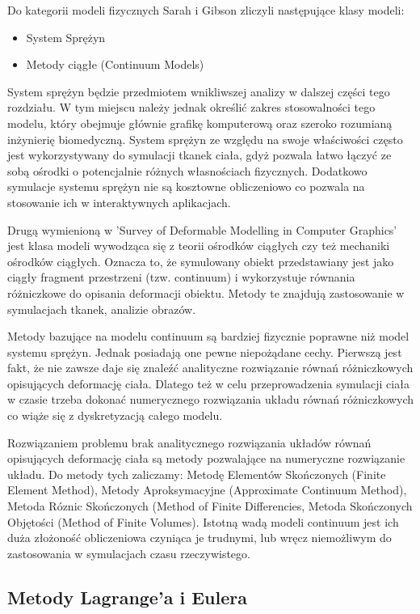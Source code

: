 Do kategorii modeli fizycznych Sarah i Gibson zliczyli następujące klasy modeli:
\begin{itemize}
\item System Sprężyn
\item Metody ciągłe (Continuum Models)
\end{itemize}

System sprężyn będzie przedmiotem wnikliwszej analizy w dalszej części tego
rozdziału. W tym miejscu należy jednak określić zakres stosowalności tego
modelu, który obejmuje głównie grafikę komputerową oraz szeroko rozumianą
inżynierię biomedyczną. System sprężyn ze względu na swoje właściwości 
często jest wykorzystywany do symulacji tkanek ciała, gdyż pozwala łatwo łączyć ze
sobą ośrodki o potencjalnie różnych własnościach fizycznych. Dodatkowo symulacje
systemu sprężyn nie są kosztowne obliczeniowo co pozwala na stosowanie ich w
interaktywnych aplikacjach.

Drugą wymienioną w 'Survey of Deformable Modelling in Computer Graphics' jest
klasa modeli wywodząca się z teorii ośrodków ciągłych czy też mechaniki ośrodków
ciągłych. Oznacza to, że symulowany obiekt przedstawiany jest jako ciągły
fragment przestrzeni (tzw. continuum) i wykorzystuje równania różniczkowe do
opisania deformacji obiektu. Metody te znajdują zastosowanie w symulacjach
tkanek, analizie obrazów.\cite{TR97-19}

Metody bazujące na modelu continuum są bardziej fizycznie poprawne niż model
systemu sprężyn\cite{TR97-19}. Jednak posiadają one pewne niepożądane cechy.
Pierwszą jest fakt, że nie zawsze daje się znaleźć analityczne rozwiązanie
równań różniczkowych opisujących deformację ciała. Dlatego też w celu
przeprowadzenia symulacji ciała w czasie trzeba dokonać numerycznego rozwiązania
układu równań różniczkowych co wiąże się z dyskretyzacją całego modelu.

Rozwiązaniem problemu brak analitycznego rozwiązania układów równań opisujących
deformację ciała są metody pozwalające na numeryczne rozwiązanie układu. Do
metody tych zaliczamy: Metodę Elementów Skończonych (Finite Element Method),
 Metody Aproksymacyjne (Approximate Continuum Method), Metoda Róznic Skończonych
 (Method of Finite Differencies, Metoda Skończonych Objętości (Method of Finite
 Volumes). Istotną wadą modeli continuum jest ich duża złożoność obliczeniowa
czyniąca je trudnymi, lub wręcz niemożliwym do zastosowania w symulacjach czasu
rzeczywistego.

\subsection{Metody Lagrange'a i Eulera}

